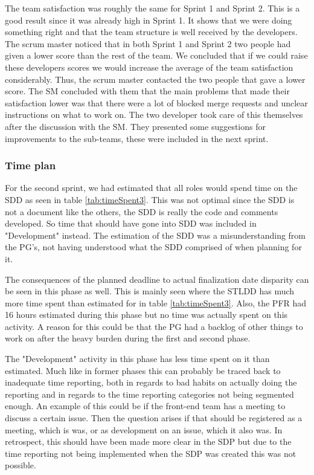 \documentclass{article}
\begin{document}
The team satisfaction was roughly the same for Sprint 1 and Sprint 2. This is a good result since it was already high in Sprint 1. It shows that we were doing something right and that the team structure is well received by the developers. The scrum master noticed that in both Sprint 1 and Sprint 2 two people had given a lower score than the rest of the team. We concluded that if we could raise these developers scores we would increase the average of the team satisfaction considerably. Thus, the scrum master contacted the two people that gave a lower score. The SM concluded with them that the main problems that made their satisfaction lower was that there were a lot of blocked merge requests and unclear instructions on what to work on. The two developer took care of this themselves after the discussion with the SM. They presented some suggestions for improvements to the sub-teams, these were included in the next sprint.

\subsubsection{Time plan}
For the second sprint, we had estimated that all roles would spend time on the SDD as seen in table \ref{tab:timeSpent3}. This was not optimal since the SDD is not a document like the others, the SDD is really the code and comments developed. So time that should have gone into SDD  was included in "Development" instead. The estimation of the SDD was a misunderstanding from the PG's, not having understood what the SDD comprised of when planning for it. 

The consequences of the planned deadline to actual finalization date disparity can be seen in this phase as well. This is mainly seen where the STLDD has much more time spent than estimated for in table \ref{tab:timeSpent3}. Also, the PFR had 16 hours estimated during this phase but no time was actually spent on this activity. A reason for this could be that the PG had a backlog of other things to work on after the heavy burden during the first and second phase.  

The "Development" activity in this phase has less time spent on it than estimated. Much like in former phases this can probably be traced back to inadequate time reporting, both in regards to bad habits on actually doing the reporting and in regards to the time reporting categories not being segmented enough. An example of this could be if the front-end team has a meeting to discuss a certain issue. Then the question arises if that should be registered as a meeting, which is was, or as development on an issue, which it also was. In retrospect, this should have been made more clear in the SDP but due to the time reporting not being implemented when the SDP was created this was not possible. 
 
\end{document}
